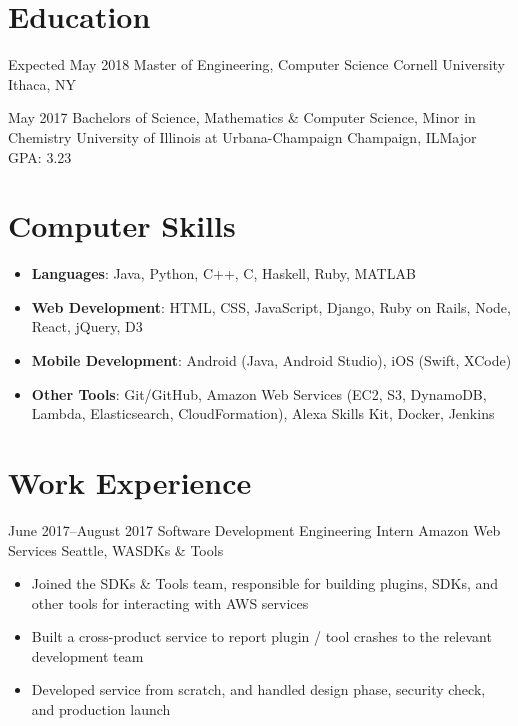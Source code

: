 \documentclass[10pt,a4paper,sans]{moderncv}        %
\begin{document}
\makecvtitle

\section{Education}

\vspace{2pt}
\cventry
{Expected May 2018}
{Master of Engineering, Computer Science}
{Cornell University}
{Ithaca, NY}{}{}

\cventry
{May 2017}
{Bachelors of Science, Mathematics \& Computer Science, Minor in Chemistry}
{University of Illinois at Urbana-Champaign}
{Champaign, IL}{}{Major GPA: 3.23}

\section{Computer Skills}
\vspace{2pt}
\begin{itemize}
  \vspace{3pt}
  \item
    \textbf{Languages}: Java, Python, C++, C, Haskell, Ruby, MATLAB
  \item
    \textbf{Web Development}: HTML, CSS, JavaScript, Django, Ruby on Rails, Node,
                              React, jQuery, D3
  \item
    \textbf{Mobile Development}: Android (Java, Android Studio), iOS (Swift, XCode)
  \item
    \textbf{Other Tools}: Git/GitHub, Amazon Web Services (EC2, S3, DynamoDB, Lambda, Elasticsearch, CloudFormation),
     Alexa Skills Kit, Docker, Jenkins
\end{itemize}

\section{Work Experience}
\vspace{2pt}

\cventry
{June 2017--August 2017}
{\vspace{3pt}Software Development Engineering Intern}
{Amazon Web Services}
{Seattle, WA}{SDKs \& Tools}
{
\begin{itemize}
  \item Joined the SDKs \& Tools team, responsible for building plugins, SDKs, and other tools for interacting with AWS services
  \item Built a cross-product service to report plugin / tool crashes to the relevant development team
  \item Developed service from scratch, and handled design phase, security check, and production launch
\end{itemize}}
\end{document}
